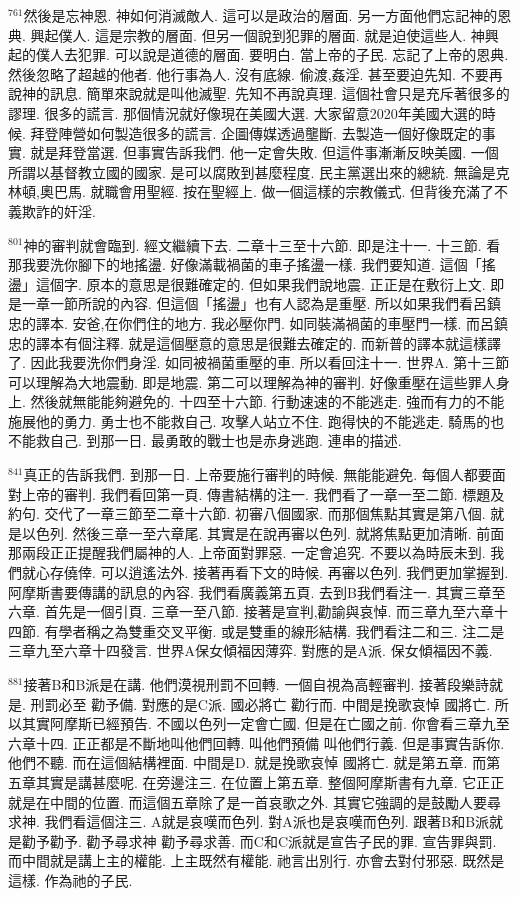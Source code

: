 \documentclass{book}
\begin{document}
$^{761}$然後是忘神恩.
神如何消滅敵人.
這可以是政治的層面.
另一方面他們忘記神的恩典.
興起僕人.
這是宗教的層面.
但另一個說到犯罪的層面.
就是迫使這些人.
神興起的僕人去犯罪.
可以說是道德的層面.
要明白.
當上帝的子民.
忘記了上帝的恩典.
然後忽略了超越的他者.
他行事為人.
沒有底線.
偷渡,姦淫.
甚至要迫先知.
不要再說神的訊息.
簡單來說就是叫他滅聖.
先知不再說真理.
這個社會只是充斥著很多的謬理.
很多的謊言.
那個情況就好像現在美國大選.
大家留意2020年美國大選的時候.
拜登陣營如何製造很多的謊言.
企圖傳媒透過壟斷.
去製造一個好像既定的事實.
就是拜登當選.
但事實告訴我們.
他一定會失敗.
但這件事漸漸反映美國.
一個所謂以基督教立國的國家.
是可以腐敗到甚麼程度.
民主黨選出來的總統.
無論是克林頓,奧巴馬.
就職會用聖經.
按在聖經上.
做一個這樣的宗教儀式.
但背後充滿了不義欺詐的奸淫.

$^{801}$神的審判就會臨到.
經文繼續下去.
二章十三至十六節.
即是注十一.
十三節.
看那我要洗你腳下的地搖盪.
好像滿載禍菌的車子搖盪一樣.
我們要知道.
這個「搖盪」這個字.
原本的意思是很難確定的.
但如果我們說地震.
正正是在敷衍上文.
即是一章一節所說的內容.
但這個「搖盪」也有人認為是重壓.
所以如果我們看呂鎮忠的譯本.
安爸,在你們住的地方.
我必壓你門.
如同裝滿禍菌的車壓門一樣.
而呂鎮忠的譯本有個注釋.
就是這個壓意的意思是很難去確定的.
而新普的譯本就這樣譯了.
因此我要洗你們身淫.
如同被禍菌重壓的車.
所以看回注十一.
世界A.
第十三節可以理解為大地震動.
即是地震.
第二可以理解為神的審判.
好像重壓在這些罪人身上.
然後就無能能夠避免的.
十四至十六節.
行動速速的不能逃走.
強而有力的不能施展他的勇力.
勇士也不能救自己.
攻擊人站立不住.
跑得快的不能逃走.
騎馬的也不能救自己.
到那一日.
最勇敢的戰士也是赤身逃跑.
連串的描述.

$^{841}$真正的告訴我們.
到那一日.
上帝要施行審判的時候.
無能能避免.
每個人都要面對上帝的審判.
我們看回第一頁.
傳書結構的注一.
我們看了一章一至二節.
標題及約句.
交代了一章三節至二章十六節.
初審八個國家.
而那個焦點其實是第八個.
就是以色列.
然後三章一至六章尾.
其實是在說再審以色列.
就將焦點更加清晰.
前面那兩段正正提醒我們屬神的人.
上帝面對罪惡.
一定會追究.
不要以為時辰未到.
我們就心存僥倖.
可以逍遙法外.
接著再看下文的時候.
再審以色列.
我們更加掌握到.
阿摩斯書要傳講的訊息的內容.
我們看廣義第五頁.
去到B我們看注一.
其實三章至六章.
首先是一個引頁.
三章一至八節.
接著是宣判,勸諭與哀悼.
而三章九至六章十四節.
有學者稱之為雙重交叉平衡.
或是雙重的線形結構.
我們看注二和三.
注二是三章九至六章十四發言.
世界A保女傾福因薄弈.
對應的是A派.
保女傾福因不義.

$^{881}$接著B和B派是在講.
他們漠視刑罰不回轉.
一個自視為高輕審判.
接著段樂詩就是.
刑罰必至 勸予備.
對應的是C派.
國必將亡 勸行而.
中間是挽歌哀悼 國將亡.
所以其實阿摩斯已經預告.
不國以色列一定會亡國.
但是在亡國之前.
你會看三章九至六章十四.
正正都是不斷地叫他們回轉.
叫他們預備 叫他們行義.
但是事實告訴你.
他們不聽.
而在這個結構裡面.
中間是D.
就是挽歌哀悼 國將亡.
就是第五章.
而第五章其實是講甚麼呢.
在旁邊注三.
在位置上第五章.
整個阿摩斯書有九章.
它正正就是在中間的位置.
而這個五章除了是一首哀歌之外.
其實它強調的是鼓勵人要尋求神.
我們看這個注三.
A就是哀嘆而色列.
對A派也是哀嘆而色列.
跟著B和B派就是勸予勸予.
勸予尋求神 勸予尋求善.
而C和C派就是宣告子民的罪.
宣告罪與罰.
而中間就是講上主的權能.
上主既然有權能.
祂言出別行.
亦會去對付邪惡.
既然是這樣.
作為祂的子民.
\end{document}
